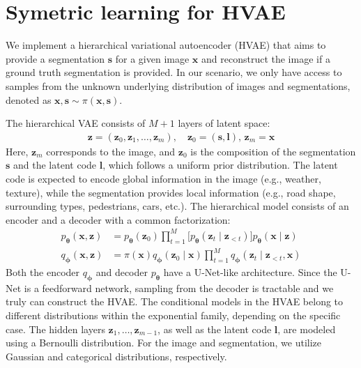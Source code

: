 \section{Symetric learning for HVAE}\label{sec:sym_learning_adaptation}
We implement a hierarchical variational autoencoder (HVAE) that aims to provide a segmentation 
$\mathbf{s}$ for a given image $\mathbf{x}$ and reconstruct the image if a ground truth segmentation is provided. 
In our scenario, we only have access to samples from the unknown underlying distribution of images and
segmentations, denoted as $\mathbf{x}, \mathbf{s} \sim \pi(\mathbf{x},\mathbf{s})$.

The hierarchical VAE consists of $M+1$ layers of latent space:
\begin{align*}
\mathbf{z} = (\mathbf{z}_0, \mathbf{z}_1, \dots, \mathbf{z}_m), \quad \mathbf{z}_0 = (\mathbf{s}, \mathbf{l}),\, \mathbf{z}_m = \mathbf{x}
\end{align*}
Here, $\mathbf{z}_m$ corresponds to the image, and $\mathbf{z}_0$ is the composition of the segmentation $\mathbf{s}$ and 
the latent code $\mathbf{l}$, which follows a uniform prior distribution. The latent code is expected to encode global
information in the image (e.g., weather, texture), while the segmentation provides local information (e.g., road shape,
surrounding types, pedestrians, cars, etc.). The hierarchical model consists of an encoder and
 a decoder with a common factorization:
\begin{align*}
    p_{\boldsymbol{\theta}}(\boldsymbol{x},\boldsymbol{z})&=p_{\boldsymbol{\theta}}(\boldsymbol{z}_{0}) \prod_{t=1}^{M}\bigl[p_{\boldsymbol{\theta}}(\boldsymbol{z}_{t}\mid\boldsymbol{z}_{<t}) \bigr]  p_{\boldsymbol{\theta}}(\boldsymbol{x}\mid\boldsymbol{z})  \\
    q_{\boldsymbol{\phi}}(\boldsymbol{x},\boldsymbol{z}) &=\pi(\boldsymbol{x})q_{\boldsymbol{\phi}}(\boldsymbol{z}_{0}\mid\boldsymbol{x}) \prod_{t=1}^{M}  q_{\boldsymbol{\phi}}(\boldsymbol{z}_{t}\mid\boldsymbol{z}_{<t},\boldsymbol{x}) 
\end{align*}
Both the encoder $q_{\boldsymbol{\phi}}$ and decoder $p_{\boldsymbol{\theta}}$ have a U-Net-like architecture. Since
 the U-Net is a feedforward network, sampling from the decoder is tractable and we truly can construct the HVAE. 
 The conditional models in the HVAE belong to different distributions within the exponential family, depending on the 
 specific case. The hidden layers $\mathbf{z}_1, \dots, \mathbf{z}_{m-1}$, as well as the latent 
 code $\mathbf{l}$, are modeled using a Bernoulli distribution. For the image and segmentation, we utilize Gaussian
 and categorical distributions, respectively.
 
